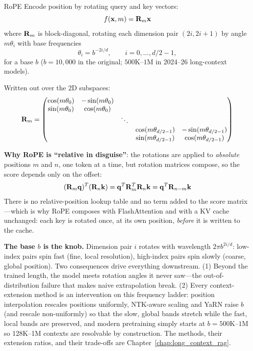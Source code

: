 \begin{mathresult}{RoPE}
Encode position by rotating query and key vectors:
\begin{equation}
f(\mathbf{x}, m) = \mathbf{R}_m \mathbf{x}
\end{equation}
where $\mathbf{R}_m$ is block-diagonal, rotating each dimension pair $(2i, 2i{+}1)$ by angle $m\theta_i$ with base frequencies
\begin{equation}
\theta_i = b^{-2i/d}, \qquad i = 0, \ldots, d/2 - 1,
\end{equation}
for a base $b$ ($b = 10{,}000$ in the original; $500\text{K--}1\text{M}$ in 2024--26 long-context models).
\end{mathresult}

Written out over the 2D subspaces:
\begin{equation}
\mathbf{R}_m = \begin{pmatrix}
\cos(m\theta_0) & -\sin(m\theta_0) & & \\
\sin(m\theta_0) & \cos(m\theta_0) & & \\
& & \ddots & \\
& & & \cos(m\theta_{d/2-1}) & -\sin(m\theta_{d/2-1}) \\
& & & \sin(m\theta_{d/2-1}) & \cos(m\theta_{d/2-1})
\end{pmatrix}
\end{equation}

\textbf{Why RoPE is ``relative in disguise''}: the rotations are applied to \textit{absolute} positions $m$ and $n$, one token at a time, but rotation matrices compose, so the score depends only on the offset:
\begin{equation}
(\mathbf{R}_m \mathbf{q})^T (\mathbf{R}_n \mathbf{k}) = \mathbf{q}^T \mathbf{R}_m^T \mathbf{R}_n \mathbf{k} = \mathbf{q}^T \mathbf{R}_{n-m} \mathbf{k}
\end{equation}
There is no relative-position lookup table and no term added to the score matrix---which is why RoPE composes with FlashAttention and with a KV cache unchanged: each key is rotated once, at its own position, \textit{before} it is written to the cache.

\textbf{The base $b$ is the knob.} Dimension pair $i$ rotates with wavelength $2\pi b^{2i/d}$: low-index pairs spin fast (fine, local resolution), high-index pairs spin slowly (coarse, global position). Two consequences drive everything downstream. (1) Beyond the trained length, the model meets rotation angles it never saw---the out-of-distribution failure that makes naive extrapolation break. (2) Every context-extension method is an intervention on this frequency ladder: position interpolation rescales positions uniformly, NTK-aware scaling and YaRN raise $b$ (and rescale non-uniformly) so that the slow, global bands stretch while the fast, local bands are preserved, and modern pretraining simply starts at $b = 500\text{K--}1\text{M}$ so 128K--1M contexts are resolvable by construction. The methods, their extension ratios, and their trade-offs are Chapter~\ref{chap:long_context_rag}.

